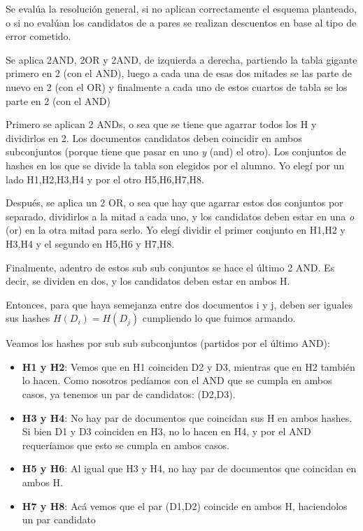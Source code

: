 \documentclass[a4paper]{article}
\newenvironment{criterio}[3]{%
    \tcolorbox[beamer,%
    noparskip,breakable,
    colback=LightCoral,colframe=DarkRed,%
    colbacklower=Tomato!75!LightCoral,%
    title=\small Criterio de Corrección: Año #1\, Cuatrimestre #2\, Oportunidad #3]}%
    {\endtcolorbox}
\begin{document}
    \begin{criterio}{2018}{1}{1}
	Se evalúa la resolución general, si no aplican correctamente el esquema planteado, o si no evalúan los candidatos de a pares se realizan descuentos en base al tipo de error cometido.  
    \end{criterio}

    Se aplica {\color{magenta}2AND}, {\color{green}2OR} y {\color{blue}2AND}, de izquierda a derecha, partiendo la tabla gigante primero en 2 (con el {\color{magenta}AND}), luego a cada una de esas dos mitades se las parte de nuevo en 2 (con el {\color{green}OR}) y finalmente a cada uno de estos cuartos de tabla se los parte en 2 (con el {\color{blue}AND})
    
    Primero se aplican 2 ANDs, o sea que se tiene que agarrar todos los H y dividirlos en 2. Los documentos candidatos deben coincidir en ambos subconjuntos (porque tiene que pasar en uno \textit{y} (and) el otro). Los conjuntos de hashes en los que se divide la tabla son elegidos por el alumno. Yo elegí por un lado H1,H2,H3,H4 y por el otro H5,H6,H7,H8.

    Después, se aplica un 2 OR, o sea que hay que agarrar estos dos conjuntos por separado, dividirlos a la mitad a cada uno, y los candidatos deben estar en una \textit{o} (or) en la otra mitad para serlo. Yo elegí dividir el primer conjunto en H1,H2 y H3,H4 y el segundo en H5,H6 y H7,H8.

    Finalmente, adentro de estos sub sub conjuntos se hace el último 2 AND. Es decir, se dividen en dos, y los candidatos deben estar en ambos H.

    Entonces, para que haya semejanza entre dos documentos i y j, deben ser iguales sus hashes $H(D_i) = H(D_j)$ cumpliendo lo que fuimos armando.
    
    Veamos los hashes por sub sub subconjuntos (partidos por el último AND):

    \begin{itemize}
    \item \textbf{H1 y H2}: Vemos que en H1 coinciden D2 y D3, mientras que en H2 también lo hacen. Como nosotros pedíamos con el AND que se cumpla en ambos casos, ya tenemos un par de candidatos: (D2,D3).

    \item \textbf{H3 y H4}: No hay par de documentos que coincidan sus H en ambos hashes. Si bien D1 y D3 coinciden en H3, no lo hacen en H4, y por el AND requeríamos que esto se cumpla en ambos casos.

    \item \textbf{H5 y H6}: Al igual que H3 y H4, no hay par de documentos que coincidan en ambos H.

    \item \textbf{H7 y H8}: Acá vemos que el par (D1,D2) coincide en ambos H, haciendolos un par candidato

    \end{itemize}
\end{document}
